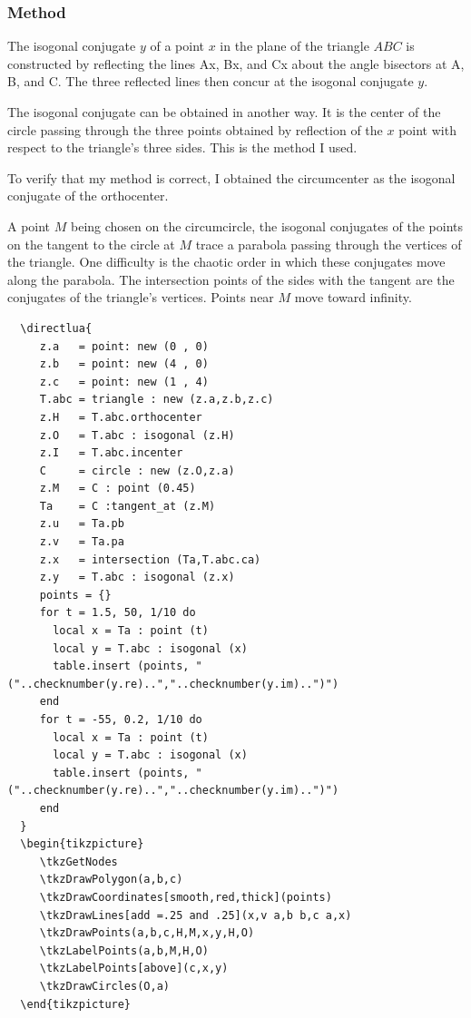 
\subsubsection{Method } %
\label{ssub:method_imeth_triangle_isogonal}

The isogonal conjugate $y$ of a point $x$ in the plane of the triangle $ABC$ is constructed by reflecting the lines Ax,  Bx, and Cx about the angle bisectors at A, B, and C. The three reflected lines then concur at the isogonal conjugate $y$.

The isogonal conjugate can be obtained in another way. It is the center of the circle passing through the three points obtained by reflection of the $x$ point with respect to the triangle's three sides.
This is the method I used.

To verify that my method is correct, I obtained the circumcenter as the isogonal conjugate of the orthocenter.

A point $M$ being chosen on the circumcircle, the isogonal conjugates of the points on the tangent to the circle at $M$ trace a parabola passing through the vertices of the triangle. One difficulty is the chaotic order in which these conjugates move along the parabola. The intersection points of the sides with the tangent are the conjugates of the triangle's vertices. Points near $M$ move toward infinity.

\begin{Verbatim}
  \directlua{
     z.a   = point: new (0 , 0)
     z.b   = point: new (4 , 0)
     z.c   = point: new (1 , 4)
     T.abc = triangle : new (z.a,z.b,z.c)
     z.H   = T.abc.orthocenter
     z.O   = T.abc : isogonal (z.H)
     z.I   = T.abc.incenter
     C     = circle : new (z.O,z.a)
     z.M   = C : point (0.45)
     Ta    = C :tangent_at (z.M)
     z.u   = Ta.pb
     z.v   = Ta.pa 
     z.x   = intersection (Ta,T.abc.ca)
     z.y   = T.abc : isogonal (z.x)
     points = {}
     for t = 1.5, 50, 1/10 do
       local x = Ta : point (t)
       local y = T.abc : isogonal (x)
       table.insert (points, "("..checknumber(y.re)..","..checknumber(y.im)..")")    
     end
     for t = -55, 0.2, 1/10 do
       local x = Ta : point (t)
       local y = T.abc : isogonal (x)
       table.insert (points, "("..checknumber(y.re)..","..checknumber(y.im)..")")    
     end
  }
  \begin{tikzpicture}
     \tkzGetNodes
     \tkzDrawPolygon(a,b,c)
     \tkzDrawCoordinates[smooth,red,thick](points)
     \tkzDrawLines[add =.25 and .25](x,v a,b b,c a,x)
     \tkzDrawPoints(a,b,c,H,M,x,y,H,O)
     \tkzLabelPoints(a,b,M,H,O)
     \tkzLabelPoints[above](c,x,y)
     \tkzDrawCircles(O,a)
  \end{tikzpicture}
\end{Verbatim}


